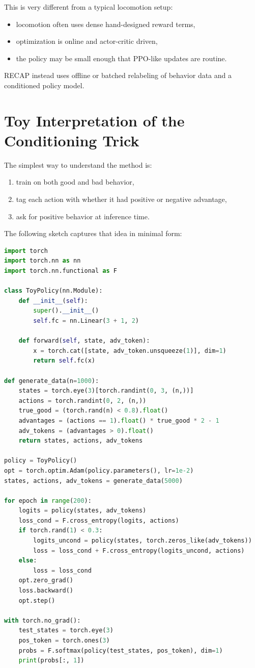 \documentclass[11pt]{article}
\begin{document}
This is very different from a typical locomotion setup:
\begin{itemize}[leftmargin=1.5em]
  \item locomotion often uses dense hand-designed reward terms,
  \item optimization is online and actor-critic driven,
  \item the policy may be small enough that PPO-like updates are routine.
\end{itemize}

RECAP instead uses offline or batched relabeling of behavior data and a conditioned policy model.

\section{Toy Interpretation of the Conditioning Trick}

The simplest way to understand the method is:
\begin{enumerate}[leftmargin=1.5em]
  \item train on both good and bad behavior,
  \item tag each action with whether it had positive or negative advantage,
  \item ask for positive behavior at inference time.
\end{enumerate}

The following sketch captures that idea in minimal form:

\begin{lstlisting}[language=Python, caption={Tiny toy sketch of the RECAP conditioning idea.}]
import torch
import torch.nn as nn
import torch.nn.functional as F

class ToyPolicy(nn.Module):
    def __init__(self):
        super().__init__()
        self.fc = nn.Linear(3 + 1, 2)

    def forward(self, state, adv_token):
        x = torch.cat([state, adv_token.unsqueeze(1)], dim=1)
        return self.fc(x)

def generate_data(n=1000):
    states = torch.eye(3)[torch.randint(0, 3, (n,))]
    actions = torch.randint(0, 2, (n,))
    true_good = (torch.rand(n) < 0.8).float()
    advantages = (actions == 1).float() * true_good * 2 - 1
    adv_tokens = (advantages > 0).float()
    return states, actions, adv_tokens

policy = ToyPolicy()
opt = torch.optim.Adam(policy.parameters(), lr=1e-2)
states, actions, adv_tokens = generate_data(5000)

for epoch in range(200):
    logits = policy(states, adv_tokens)
    loss_cond = F.cross_entropy(logits, actions)
    if torch.rand(1) < 0.3:
        logits_uncond = policy(states, torch.zeros_like(adv_tokens))
        loss = loss_cond + F.cross_entropy(logits_uncond, actions)
    else:
        loss = loss_cond
    opt.zero_grad()
    loss.backward()
    opt.step()

with torch.no_grad():
    test_states = torch.eye(3)
    pos_token = torch.ones(3)
    probs = F.softmax(policy(test_states, pos_token), dim=1)
    print(probs[:, 1])
\end{lstlisting}
\end{document}
